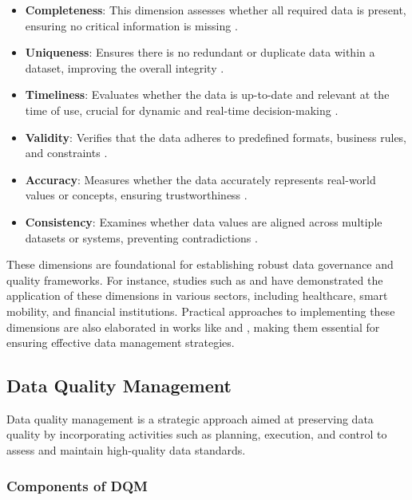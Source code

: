\documentclass[conference]{IEEEtran}
\begin{document}
\begin{itemize}
    \item \textbf{Completeness}: This dimension assesses whether all required data is present, ensuring no critical information is missing \cite{mahanti2019data}.
    \item \textbf{Uniqueness}: Ensures there is no redundant or duplicate data within a dataset, improving the overall integrity \cite{sebastiancoleman2022meeting}.
    \item \textbf{Timeliness}: Evaluates whether the data is up-to-date and relevant at the time of use, crucial for dynamic and real-time decision-making \cite{mashoufi2023data}.
    \item \textbf{Validity}: Verifies that the data adheres to predefined formats, business rules, and constraints \cite{mcgilvray2021executing}.
    \item \textbf{Accuracy}: Measures whether the data accurately represents real-world values or concepts, ensuring trustworthiness \cite{west2021towards}.
    \item \textbf{Consistency}: Examines whether data values are aligned across multiple datasets or systems, preventing contradictions \cite{antonio2024data}.
\end{itemize}

These dimensions are foundational for establishing robust data governance and quality frameworks. For instance, studies such as \cite{wahyudi2023data} and \cite{kiran2024addressing} have demonstrated the application of these dimensions in various sectors, including healthcare, smart mobility, and financial institutions. Practical approaches to implementing these dimensions are also elaborated in works like \cite{sebastiancoleman2022meeting} and \cite{mahanti2019data}, making them essential for ensuring effective data management strategies.

\subsection{Data Quality Management}
Data quality management is a strategic approach aimed at preserving data quality by incorporating activities such as planning, execution, and control to assess and maintain high-quality data standards.

\subsubsection{Components of DQM}
\end{document}
